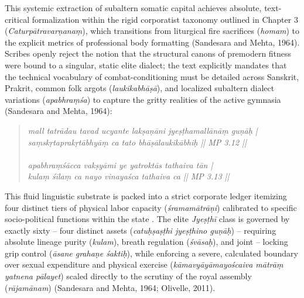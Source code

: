\documentclass[11pt,twoside,letterpaper]{article}
\begin{document}
This systemic extraction of subaltern somatic capital achieves absolute, text-critical formalization within the rigid corporatist taxonomy outlined in Chapter 3 (\textit{Caturp\={a}travar\d{n}ana\d{m}}), which transitions from liturgical fire sacrifices (\textit{homam}) to the explicit metrics of professional body formatting (Sandesara and Mehta, 1964). Scribes openly reject the notion that the structural canons of premodern fitness were bound to a singular, static elite dialect; the text explicitly mandates that the technical vocabulary of combat-conditioning must be detailed across Sanskrit, Prakrit, common folk argots (\textit{laukikabh\={a}\d{s}\={a}}), and localized subaltern dialect variations (\textit{apabhra\d{m}\'sa}) to capture the gritty realities of the active gymnasia (Sandesara and Mehta, 1964):

\begin{quote}
\small
\textit{mall tatr\={a}dau tavad ucyante lak\d{s}a\d{n}\={a}ni jye\d{s}\d{t}hamall\={a}n\={a}\d{m} gu\d{n}\={a}\d{h} |}\\
\textit{sa\d{m}sk\d{r}taprak\d{r}t\={a}bhy\={a}\d{m} ca tato bh\={a}\d{s}\={a}laukik\={a}bhi\d{h} || MP 3.12 ||} \\
\\
\textit{apabhra\d{m}\'s\={a}cca vak\d{s}y\={a}mi ye yatrokt\={a}s tathaiva t\={a}n |}\\ 
\textit{kula\d{m} \'s\={i}la\d{m} ca nayo vinaya\'sca tathaiva ca || MP 3.13 ||}
\end{quote}

This fluid linguistic substrate is packed into a strict corporate ledger itemizing four distinct tiers of physical labor capacity (\textit{\'sramam\={a}tr\={a}\d{n}i}) calibrated to specific socio-political functions within the state \citep{Sandesara1964}. The elite \textit{Jye\d{s}\d{t}h\={i}} class is governed by exactly sixty -- four distinct assets (\textit{catu\d{h}\d{s}a\d{s}\d{t}hi jye\d{s}\d{t}hino gu\d{n}\={a}\d{h}}) -- requiring absolute lineage purity (\textit{kulam}), breath regulation (\textit{\'sv\={a}sa\d{h}}), and joint -- locking grip control (\textit{\={a}sane graha\d{n}e \'sakti\d{h}}), while enforcing a severe, calculated boundary over sexual expenditure and physical exercise (\textit{k\={a}mavy\={a}y\={a}mayo\'scaiva m\={a}tr\={a}\d{m} yatnena p\={a}layet}) scaled directly to the scrutiny of the royal assembly (\textit{r\={a}jam\={a}nam}) (Sandesara and Mehta, 1964; Olivelle, 2011).
\end{document}
